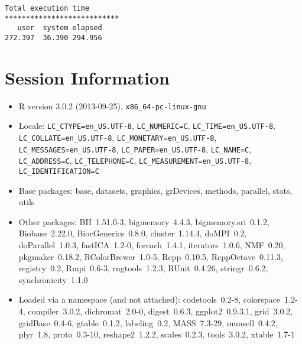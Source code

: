 \documentclass[10pt]{article}\usepackage[]{graphicx}\usepackage[]{color}
\begin{document}
\begin{verbatim}
Total execution time
***************************
   user  system elapsed 
272.397  36.390 294.956 

\end{verbatim}

\section*{Session Information}
\begin{itemize}\raggedright
  \item R version 3.0.2 (2013-09-25), \verb|x86_64-pc-linux-gnu|
  \item Locale: \verb|LC_CTYPE=en_US.UTF-8|, \verb|LC_NUMERIC=C|, \verb|LC_TIME=en_US.UTF-8|, \verb|LC_COLLATE=en_US.UTF-8|, \verb|LC_MONETARY=en_US.UTF-8|, \verb|LC_MESSAGES=en_US.UTF-8|, \verb|LC_PAPER=en_US.UTF-8|, \verb|LC_NAME=C|, \verb|LC_ADDRESS=C|, \verb|LC_TELEPHONE=C|, \verb|LC_MEASUREMENT=en_US.UTF-8|, \verb|LC_IDENTIFICATION=C|
  \item Base packages: base, datasets, graphics, grDevices, methods,
    parallel, stats, utils
  \item Other packages: BH~1.51.0-3, bigmemory~4.4.3,
    bigmemory.sri~0.1.2, Biobase~2.22.0, BiocGenerics~0.8.0,
    cluster~1.14.4, doMPI~0.2, doParallel~1.0.3, fastICA~1.2-0,
    foreach~1.4.1, iterators~1.0.6, NMF~0.20, pkgmaker~0.18.2,
    RColorBrewer~1.0-5, Rcpp~0.10.5, RcppOctave~0.11.3, registry~0.2,
    Rmpi~0.6-3, rngtools~1.2.3, RUnit~0.4.26, stringr~0.6.2,
    synchronicity~1.1.0
  \item Loaded via a namespace (and not attached): codetools~0.2-8,
    colorspace~1.2-4, compiler~3.0.2, dichromat~2.0-0, digest~0.6.3,
    ggplot2~0.9.3.1, grid~3.0.2, gridBase~0.4-6, gtable~0.1.2,
    labeling~0.2, MASS~7.3-29, munsell~0.4.2, plyr~1.8, proto~0.3-10,
    reshape2~1.2.2, scales~0.2.3, tools~3.0.2, xtable~1.7-1
\end{itemize}
\end{document}
